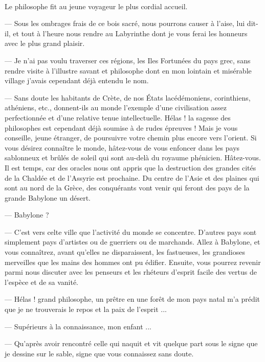 \documentclass[a4paper, 11pt, oneside, polutonikogreek, french]{article}
\begin{document}
\paragraph{}
Le philosophe fit au jeune voyageur le plus cordial accueil.

--- Sous les ombrages frais de ce bois sacré, nous pourrons causer à l'aise, lui dit-il, et tout à l'heure nous rendre au Labyrinthe dont je vous ferai les honneurs avec le plus grand plaisir.

--- Je n'ai pas voulu traverser ces régions, les Iles Fortunées du pays grec, sans rendre visite à l'illustre savant et philosophe dont en mon lointain et misérable village j'avais cependant déjà entendu le nom.

--- Sans doute les habitants de Crète, de nos États lacédémoniens, corinthiens, athéniens, etc., donnent-ils au monde l'exemple d'une civilisation assez perfectionnée et d'une relative tenue intellectuelle. Hélas ! la sagesse des philosophes est cependant déjà soumise à de rudes épreuves ! Mais je vous conseille, jeune étranger, de poursuivre votre chemin plus encore vers l'orient. Si vous désirez connaître le monde, hâtez-vous de vous enfoncer dans les pays sablonneux et brûlés de soleil qui sont au-delà du royaume phénicien. Hâtez-vous. Il est temps, car des oracles nous ont appris que la destruction des grandes cités de la Chaldée et de l'Assyrie est prochaine. Du centre de l'Asie et des plaines qui sont au nord de la Grèce, des conquérants vont venir qui feront des pays de la grande Babylone un désert.

--- Babylone ?

--- C'est vers celte ville que l'activité du monde se concentre. D'autres pays sont simplement pays d'artistes ou de guerriers ou de marchands. Allez à Babylone, et vous connaîtrez, avant qu'elles ne disparaissent, les fastueuses, les grandioses merveilles que les mains des hommes ont pu édifier. Ensuite, vous pourrez revenir parmi nous discuter avec les penseurs et les rhéteurs d'esprit facile des vertus de l'espèce et de sa vanité.

\bigskip
\centerline{\EightStarTaper}
\centerline{\EightStarTaper\EightStarTaper}
\bigskip

--- Hélas ! grand philosophe, un prêtre en une forêt de mon pays natal m'a prédit que je ne trouverais le repos et la paix de l'esprit ...

--- Supérieurs à la connaissance, mon enfant ...

--- Qu'après avoir rencontré celle qui naquit et vit quelque part sous le signe que je dessine sur le sable, signe que vous connaissez sans doute.
\end{document}
